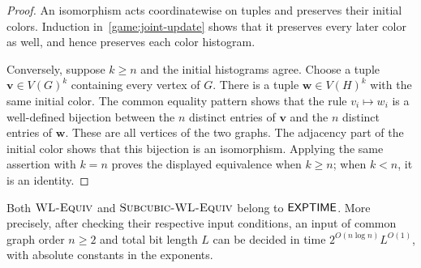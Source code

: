 \begin{proof}
An isomorphism acts coordinatewise on tuples and preserves their initial
colors.  Induction in~\eqref{game:joint-update} shows that it preserves every
later color as well, and hence preserves each color histogram.

Conversely, suppose $k\geq n$ and the initial histograms agree.  Choose a
tuple $\mathbf v\in V(G)^k$ containing every vertex of $G$.  There is a tuple
$\mathbf w\in V(H)^k$ with the same initial color.  The common equality
pattern shows that the rule $v_i\mapsto w_i$ is a well-defined bijection
between the $n$ distinct entries of $\mathbf v$ and the $n$ distinct entries
of $\mathbf w$.  These are all vertices of the two graphs.  The adjacency
part of the initial color shows that this bijection is an isomorphism.
Applying the same assertion with $k=n$ proves the displayed equivalence
when $k\geq n$; when $k<n$, it is an identity.
\end{proof}

\begin{proposition}
\label{prop:membership}
Both \(\textnormal{\textsc{WL-Equiv}}\) and \(\textnormal{\textsc{Subcubic-WL-Equiv}}\) belong to \(\mathsf{EXPTIME}\).
More precisely, after checking their respective input conditions,
an input of common graph order \(n\ge2\) and total bit length \(L\)
can be decided in time
$2^{O(n\log n)}L^{O(1)}$, with absolute constants in the exponents.
\end{proposition}

